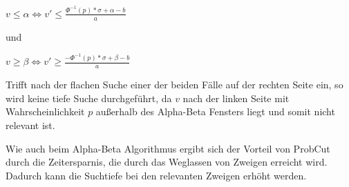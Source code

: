 \(v\leq\alpha \iff v'\leq\frac{\Phi^{-1}(p)*\sigma+\alpha-b}{a}\)

und

\(v\geq\beta \iff v'\geq\frac{-\Phi^{-1}(p)*\sigma+\beta-b}{a}\)

Trifft nach der flachen Suche einer der beiden Fälle auf der rechten Seite ein, so wird keine tiefe Suche durchgeführt, da \(v\) nach der linken Seite mit Wahrscheinlichkeit \(p\) außerhalb des Alpha-Beta Fensters liegt
und somit nicht relevant ist.

Wie auch beim Alpha-Beta Algorithmus ergibt sich der Vorteil von ProbCut durch die Zeitersparnis, die durch das Weglassen von Zweigen erreicht wird. Dadurch kann die Suchtiefe bei den relevanten Zweigen erhöht werden.
\cite[S.~1]{probcut}
